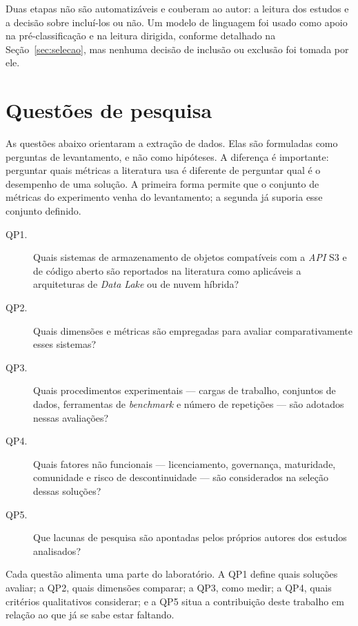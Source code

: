 Duas etapas não são automatizáveis e couberam ao autor: a leitura dos estudos e
a decisão sobre incluí-los ou não. Um modelo de linguagem foi usado como apoio
na pré-classificação e na leitura dirigida, conforme detalhado na
Seção~\ref{sec:selecao}, mas nenhuma decisão de inclusão ou exclusão foi tomada
por ele.

\section{Questões de pesquisa}
\label{sec:questoes}

As questões abaixo orientaram a extração de dados. Elas são formuladas como
perguntas de levantamento, e não como hipóteses. A diferença é importante:
perguntar quais métricas a literatura usa é diferente de perguntar qual é o
desempenho de uma solução. A primeira forma permite que o conjunto de métricas
do experimento venha do levantamento; a segunda já suporia esse conjunto
definido.

\begin{description}
    \item[QP1.] Quais sistemas de armazenamento de objetos compatíveis com a
          \textit{API} S3 e de código aberto são reportados na literatura como
          aplicáveis a arquiteturas de \textit{Data Lake} ou de nuvem híbrida?

    \item[QP2.] Quais dimensões e métricas são empregadas para avaliar
          comparativamente esses sistemas?

    \item[QP3.] Quais procedimentos experimentais --- cargas de trabalho,
          conjuntos de dados, ferramentas de \textit{benchmark} e número de
          repetições --- são adotados nessas avaliações?

    \item[QP4.] Quais fatores não funcionais --- licenciamento, governança,
          maturidade, comunidade e risco de descontinuidade --- são considerados
          na seleção dessas soluções?

    \item[QP5.] Que lacunas de pesquisa são apontadas pelos próprios autores dos
          estudos analisados?
\end{description}

Cada questão alimenta uma parte do laboratório. A QP1 define quais soluções
avaliar; a QP2, quais dimensões comparar; a QP3, como medir; a QP4, quais
critérios qualitativos considerar; e a QP5 situa a contribuição deste trabalho
em relação ao que já se sabe estar faltando.

